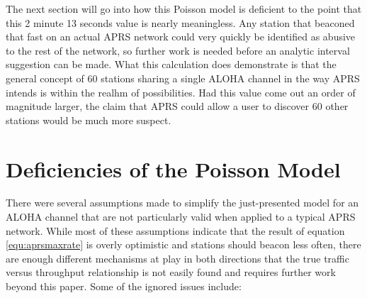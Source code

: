 The next section will go into how this Poisson model is deficient to the
point that this 2 minute 13 seconds value is nearly meaningless.
Any station that beaconed that fast on an actual APRS network could very quickly
be identified as abusive to the rest of the network, so further work is needed
before an analytic interval suggestion can be made.
What this calculation does demonstrate is that the general concept of 60 stations
sharing a single ALOHA channel in the way APRS intends is within the realhm of
possibilities. 
Had this value come out an order of magnitude larger, the claim
that APRS could allow a user to discover 60 other stations would be much more suspect.

\section{Deficiencies of the Poisson Model}

There were several assumptions made to simplify the just-presented model 
for an ALOHA channel that are not particularly valid 
when applied to a typical APRS network. 
While most of these assumptions indicate that the result of
equation \ref{equ:aprsmaxrate} is overly optimistic and 
stations should beacon less often, there are enough different mechanisms at play
in both directions that the true traffic versus throughput relationship 
is not easily found and requires further work beyond this paper.
Some of the ignored issues include:

